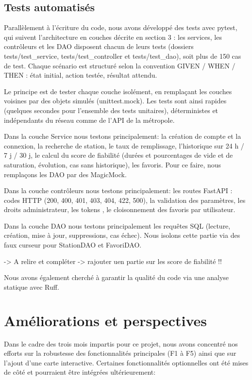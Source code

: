 \documentclass[
  french,
  11pt,
  a4paper,
]{article}
\begin{document}
\subsection{Tests automatisés}\label{tests-automatisuxe9s}

Parallèlement à l'écriture du code, nous avons développé des tests avec
pytest, qui suivent l'architecture en couches décrite en section 3 : les
services, les contrôleurs et les DAO disposent chacun de leurs tests
(dossiers tests/test\_service, tests/test\_controller et
tests/test\_dao), soit plus de 150 cas de test. Chaque scénario est
structuré selon la convention GIVEN / WHEN / THEN : état initial, action
testée, résultat attendu.

Le principe est de tester chaque couche isolément, en remplaçant les
couches voisines par des objets simulés (unittest.mock). Les tests sont
ainsi rapides (quelques secondes pour l'ensemble des tests unitaires),
déterministes et indépendants du réseau comme de l'API de la métropole.

Dans la couche Service nous testons principalement: la création de
compte et la connexion, la recherche de station, le taux de remplissage,
l'historique sur 24 h / 7 j / 30 j, le calcul du score de fiabilité
(durées et pourcentages de vide et de saturation, évolution, cas sans
historique), les favoris. Pour ce faire, nous remplaçons les DAO par des
MagicMock.

Dans la couche contrôleurs nous testons principalement: les routes
FastAPI : codes HTTP (200, 400, 401, 403, 404, 422, 500), la validation
des paramètres, les droits administrateur, les tokens , le cloisonnement
des favoris par utilisateur.

Dans la couche DAO nous testons principalement les requêtes SQL
(lecture, création, mise à jour, suppressions, cas échec). Nous isolons
cette partie via des faux curseur pour StationDAO et FavoriDAO.

-\textgreater{} A relire et compléter -\textgreater{} rajouter uen
partie sur les score de fiabilité !!

Nous avons également cherché à garantir la qualité du code via une
analyse statique avec Ruff. \pagebreak

\section{Améliorations et
perspectives}\label{amuxe9liorations-et-perspectives}

Dans le cadre des trois mois impartis pour ce projet, nous avons
concentré nos efforts sur la robustesse des fonctionnalités principales
(F1 à F5) ainsi que sur l'ajout d'une carte interactive. Certaines
fonctionnalités optionnelles ont été mises de côté et pourraient être
intégrées ultérieurement:
\end{document}

